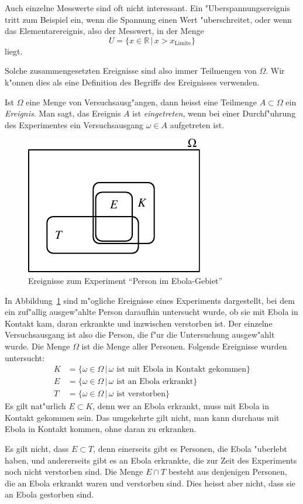 Auch einzelne Messwerte sind oft nicht interessant. 
Ein "Uberspannungsereignis tritt zum Beispiel ein, wenn die Spannung
einen Wert "uberschreitet, oder wenn das Elementarereignis, also der Messwert,
in der Menge
\[
U=
\{x\in\mathbb R\,|\, x > x_{\text{Limite}}\}
\]
liegt.

Solche zusammengesetzten Ereignisse sind also immer Teilmengen von $\Omega$.
Wir k"onnen dies als eine Definition des Begriffs des Ereignisses
verwenden.

\begin{definition}
Ist $\Omega$ eine Menge von Versuchsausg"angen, dann heisst eine Teilmenge
$A\subset\Omega$ ein {\em Ereignis}.
Man sagt, das Ereignis $A$ ist {\em eingetreten}, wenn bei einer Durchf"uhrung des
Experimentes ein Versuchsausgang $\omega\in A$ aufgetreten ist.
\end{definition}

\begin{beispiel}
\begin{figure}
\centering
\includegraphics{images/ebola-1.pdf}
\caption{Ereignisse zum Experiment ``Person im Ebola-Gebiet''
\label{image-ebola}}
\end{figure}

In Abbildung~\ref{image-ebola} sind m"ogliche Ereignisse eines Experiments
dargestellt, bei dem ein zuf"allig ausgew"ahlte Person daraufhin untersucht
wurde, ob sie mit Ebola in Kontakt kam, daran erkrankte und inzwischen
verstorben ist.
Der einzelne Versuchsausgang ist also die Person, die f"ur die
Untersuchung ausgew"ahlt wurde. 
Die Menge $\Omega$ ist die Menge aller Personen.
Folgende Ereignisse wurden untersucht:
\begin{align*}
K&=\{\omega\in\Omega\,|\,\text{$\omega$ ist mit Ebola in Kontakt gekommen}\}
\\
E&=\{\omega\in\Omega\,|\,\text{$\omega$ ist an Ebola erkrankt}\}
\\
T&=\{\omega\in\Omega\,|\,\text{$\omega$ ist verstorben}\}
\end{align*}
Es gilt nat"urlich $E\subset K$, denn wer an Ebola erkrankt, muss mit
Ebola in Kontakt gekommen sein. 
Das umgekehrte gilt nicht, man kann durchaus mit Ebola in Kontakt
kommen, ohne daran zu erkranken.

Es gilt nicht, dass $E\subset T$, denn einerseits gibt es Personen, die
Ebola "uberlebt haben, und andererseits gibt es an Ebola erkrankte,
die zur Zeit des Experiments noch nicht verstorben sind.
Die Menge $E\cap T$ besteht aus denjenigen Personen, die an Ebola
erkrankt waren und verstorben sind.
Dies heisst aber nicht, dass sie an Ebola gestorben sind.
\end{beispiel}

